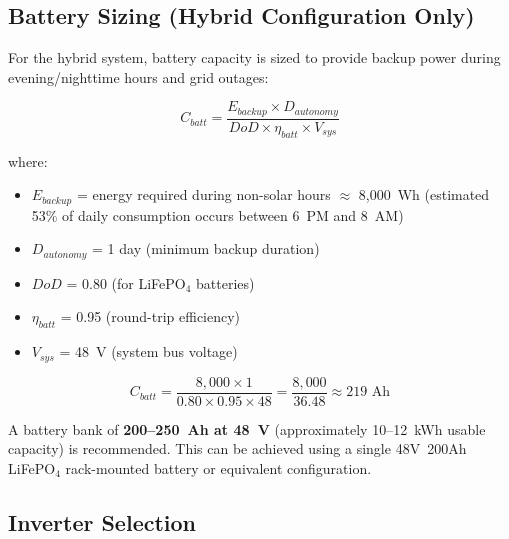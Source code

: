\subsection{Battery Sizing (Hybrid Configuration Only)}

For the hybrid system, battery capacity is sized to provide backup power during evening/nighttime hours and grid outages:

\begin{equation}
    C_{batt} = \frac{E_{backup} \times D_{autonomy}}{DoD \times \eta_{batt} \times V_{sys}}
    \label{eq:batt_sizing}
\end{equation}

\noindent where:
\begin{itemize}
    \item $E_{backup}$ = energy required during non-solar hours $\approx$ 8,000~Wh (estimated 53\% of daily consumption occurs between 6~PM and 8~AM)
    \item $D_{autonomy}$ = 1 day (minimum backup duration)
    \item $DoD$ = 0.80 (for LiFePO$_4$ batteries)
    \item $\eta_{batt}$ = 0.95 (round-trip efficiency)
    \item $V_{sys}$ = 48~V (system bus voltage)
\end{itemize}

\begin{equation}
    C_{batt} = \frac{8{,}000 \times 1}{0.80 \times 0.95 \times 48} = \frac{8{,}000}{36.48} \approx 219 \text{~Ah}
    \label{eq:batt_result}
\end{equation}

A battery bank of \textbf{200--250~Ah at 48~V} (approximately 10--12~kWh usable capacity) is recommended. This can be achieved using a single 48V~200Ah LiFePO$_4$ rack-mounted battery or equivalent configuration.


\subsection{Inverter Selection}

